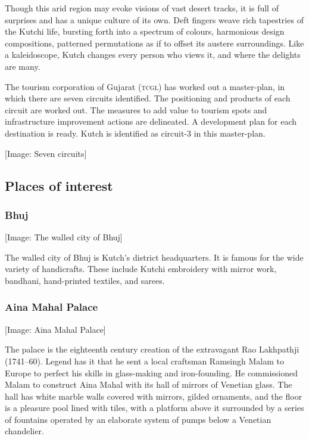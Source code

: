 Though this arid region may evoke visions of vast desert tracks, it is full of surprises and has a unique culture of its own. Deft fingers weave rich tapestries of the Kutchi life, bursting forth into a spectrum of colours, harmonious design compositions, patterned permutations as if to offset its austere surroundings. Like a kaleidoscope, Kutch changes every person who views it, and where the delights are many.

The tourism corporation of Gujarat (\textsc{tcgl}) has worked out a master-plan, in which there are seven circuits identified. The positioning and products of each circuit are worked out. The measures to add value to tourism spots and infrastructure improvement actions are delineated. A development plan for each destination is ready. Kutch is identified as circuit-3 in this master-plan.

[Image: Seven circuits]

\subsection{Places of interest} %
\label{sub:poi}

\subsubsection{Bhuj} %
\label{ssub:bhuj}

[Image: The walled city of Bhuj]

The walled city of Bhuj is Kutch's district headquarters. It is famous for the wide variety of handicrafts. These include Kutchi embroidery with mirror work, bandhani, hand-printed textiles, and sarees.


\subsubsection{Aina Mahal Palace} %
\label{ssub:amp}

[Image: Aina Mahal Palace]

The palace is the eighteenth century creation of the extravagant Rao Lakhpathji (1741--60). Legend has it that he sent a local craftsman Ramsingh Malam to Europe to perfect his skills in glass-making and iron-founding. He commissioned Malam to construct Aina Mahal with its hall of mirrors of Venetian glass. The hall has white marble walls covered with mirrors, gilded ornaments, and the floor is a pleasure pool lined with tiles, with a platform above it surrounded by a series of fountains operated by an elaborate system of pumps below a Venetian chandelier.

